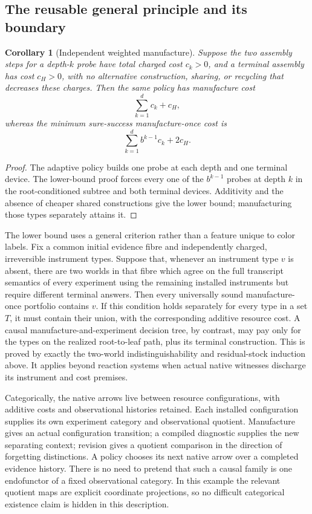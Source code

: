 \documentclass[11pt]{article}
\newtheorem{corollary}[theorem]{Corollary}
\theoremstyle{definition}
\theoremstyle{remark}
\begin{document}
\subsection{The reusable general principle and its boundary}
\begin{corollary}[Independent weighted manufacture]
Suppose the two assembly steps for a depth-$k$ probe have total charged
cost $c_k>0$, and a terminal assembly has cost $c_H>0$, with no alternative
construction, sharing, or recycling that decreases these charges. Then
the same policy has manufacture cost
\[
 \sum_{k=1}^{d}c_k+c_H,
\]
whereas the minimum sure-success manufacture-once cost is
\[
 \sum_{k=1}^{d}b^{k-1}c_k+2c_H.
\]
\end{corollary}
\begin{proof}
The adaptive policy builds one probe at each depth and one terminal device.
The lower-bound proof forces every one of the $b^{k-1}$ probes at depth
$k$ in the root-conditioned subtree and both terminal devices. Additivity
and the absence of cheaper shared constructions give the lower bound;
manufacturing those types separately attains it.
\end{proof}

The lower bound uses a general criterion rather than a feature unique to
color labels. Fix a common initial evidence fibre and independently
charged, irreversible instrument types. Suppose that, whenever an
instrument type $v$ is absent, there are two worlds in that fibre which
agree on the full transcript semantics of every experiment using the
remaining installed instruments but require different terminal answers.
Then every universally sound manufacture-once portfolio contains $v$.
If this condition holds separately for every type in a set $T$, it must
contain their union, with the corresponding additive resource cost.
A causal manufacture-and-experiment decision tree, by contrast, may pay
only for the types on the realized root-to-leaf path, plus its terminal
construction. This is proved by exactly the two-world indistinguishability
and residual-stock induction above. It applies beyond reaction systems
when actual native witnesses discharge its instrument and cost premises.

Categorically, the native arrows live between resource configurations,
with additive costs and observational histories retained. Each installed
configuration supplies its own experiment category and observational
quotient. Manufacture gives an actual configuration transition; a compiled
diagnostic supplies the new separating context; revision gives a quotient
comparison in the direction of forgetting distinctions. A policy chooses
its next native arrow over a completed evidence history. There is no need
to pretend that such a causal family is one endofunctor of a fixed
observational category. In this example the relevant quotient maps are
explicit coordinate projections, so no difficult categorical existence
claim is hidden in this description.
\end{document}

